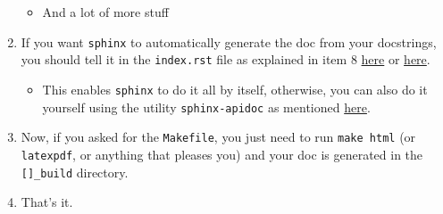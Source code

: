\documentclass[a4paper,12pt,%
              final%
              ]{article}
\begin{document}
\begin{enumerate}
\begin{itemize}
      \item And a lot of more stuff
    \end{itemize}
  \item If you want \texttt{sphinx} to automatically generate the doc from your docstrings, you should tell it in the \texttt{index.rst} file as explained in item 8 \href{https://medium.com/@richdayandnight/a-simple-tutorial-on-how-to-document-your-python-project-using-sphinx-and-rinohtype-177c22a15b5b}{here} or \href{https://eikonomega.medium.com/getting-started-with-sphinx-autodoc-part-1-2cebbbca5365}{here}.
    \begin{itemize}
      \item This enables \texttt{sphinx} to do it all by itself, otherwise, you can also do it yourself using the utility \texttt{sphinx-apidoc} as mentioned \href{https://samnicholls.net/2016/06/15/how-to-sphinx-readthedocs/}{here}.
    \end{itemize}
  \item Now, if you asked for the \texttt{Makefile}, you just need to run \verb|make html| (or \texttt{latexpdf}, or anything that pleases you) and your doc is generated in the \verb|[]_build| directory.
  \item That's it.
\end{enumerate}

\end{document}
